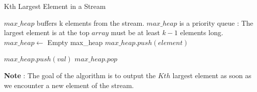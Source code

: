 \documentclass[12pt]{article}
\begin{document}
\begin{algorithm}

  \caption{Kth Largest Element in a Stream}
  \begin{algorithmic}[1]
    \LeftComment $max\_heap$ buffers k elements from the stream.
    \LeftComment $max\_heap$ is a priority queue : The largest element is at the top
    \LeftComment $array$ must be at least $k-1$ elements long.
    \Statex
        \State $max\_heap \gets$ Empty max\_heap
            \State $max\_heap.push(element)$
        \EndFor
    \EndFunction

    \Statex
    
        \State $max\_heap.push(val)$
            \State $max\_heap.pop$
        \EndWhile
        \State {}
    \EndFunction
  \end{algorithmic}
  
\end{algorithm}

\noindent
\textbf{Note} : The goal of the algorithm is to output the $Kth$ largest element as soon as we encounter a new element of the stream.
\end{document}
